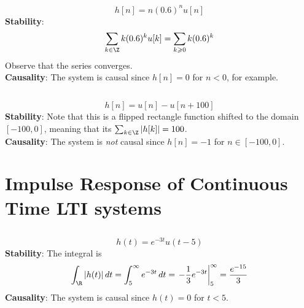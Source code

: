 \documentclass{article}
\begin{document}
\subsection{}

\begin{equation}
    h[n] = n (0.6)^n u[n]
\end{equation}
\textbf{Stability}:
\begin{equation}
    \sum_{k \in \Z} k (0.6)^k u[k] = \sum_{k \geqslant 0} k (0.6)^k
\end{equation}
Observe that the series converges. \\ %
\textbf{Causality}: The system is causal since \(h[n] = 0\) for \(n < 0\), for example.

\subsection{}

\begin{equation}
    h[n] = u[n] - u[n + 100]
\end{equation}
\textbf{Stability}: Note that this is a flipped rectangle function shifted to the domain \([-100, 0]\), meaning that its \(\sum_{k \in \Z} |h[k]| = 100\). \\
\textbf{Causality}: The system is \emph{not} causal since \(h[n] = -1\) for \(n \in [-100, 0]\).

\section{Impulse Response of Continuous Time LTI systems}

\subsection{}

\begin{equation}
    h(t) = e^{-3t} u(t - 5)
\end{equation}
\textbf{Stability}: The integral is
\begin{equation}
    \int_{\R} |h(t)| \, dt = \int_5^\infty e^{-3t} \, dt = \left.-\frac{1}{3} e^{-3t}\right|_5^\infty = \frac{e^{-15}}{3}
\end{equation}
\textbf{Causality}: The system is causal since \(h(t) = 0\) for \(t < 5\).

\subsection{}
\end{document}
